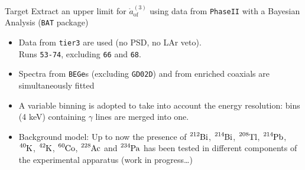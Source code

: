 \documentclass[10pt]{beamer}
\newcommand{\aof}{\mathring{a}_\text{of}^{(3)}}
\begin{document}
\begin{frame}
	\begin{alertblock}{Target}
		Extract an upper limit for $\aof$ using data from \texttt{PhaseII} with a Bayesian Analysis (\texttt{BAT} package)
	\end{alertblock}
	\begin{itemize}
	\item Data from \alert{\texttt{tier3}} are used (no PSD, no LAr veto). \\ Runs \texttt{53-74}, excluding \texttt{66} and \texttt{68}.
	\item Spectra from \texttt{BEGe}s (excluding \texttt{GD02D}) and from enriched coaxials are simultaneously fitted
	\item A \alert{variable binning} is adopted to take into account the energy resolution: bins (4 keV) containing $\gamma$ lines are merged into one.
	\item \alert{Background model:} Up to now the presence of $\ce{^{212}Bi}$, $\ce{^{214}Bi}$, $\ce{^{208}Tl}$, $\ce{^{214}Pb}$, $\ce{^{40}K}$, $\ce{^{42}K}$, $\ce{^{60}Co}$, $\ce{^{228}Ac}$ and $\ce{^{234}Pa}$ has been tested in different components of the experimental apparatus (work in progress\ldots)
	\end{itemize}
\end{frame}
\end{document}
